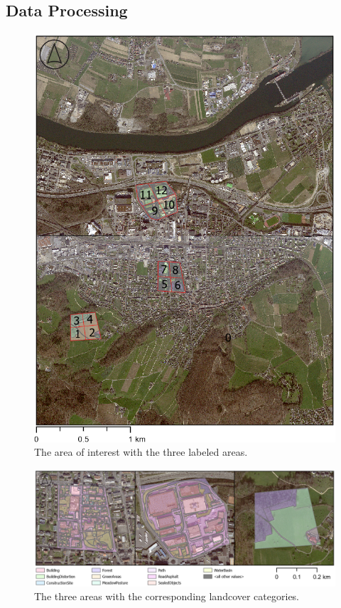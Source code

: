 \subsection{Data Processing}%



\begin{figure}[H]
    \centering
    \captionsetup{width=0.8\linewidth}
    \includegraphics[scale=0.6]{figures/AOI_Labeled.png}
    \caption{The area of interest with the three labeled areas.}
    \label{fig:aoi_labeled}
\end{figure}

\begin{figure}[H]
    \centering
    \captionsetup{width=0.8\linewidth}
    \includegraphics[width=\linewidth]{figures/category_areas.png}
    \caption{The three areas with the corresponding landcover categories.}
    \label{fig:category_areas}
\end{figure}

